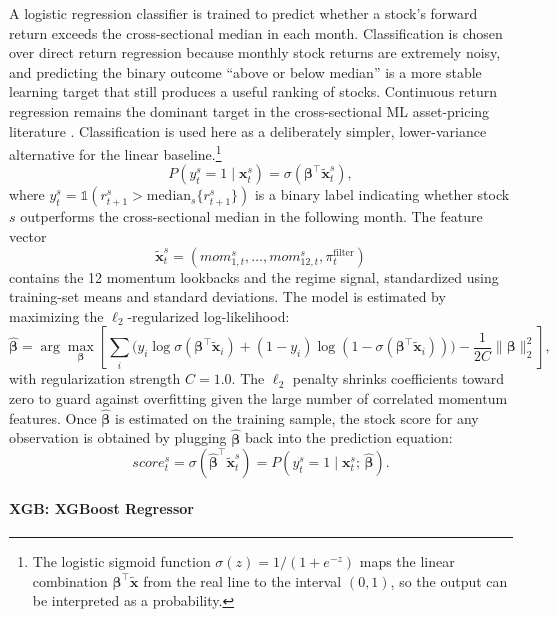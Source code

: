 A logistic regression classifier is trained to predict whether a stock's forward return exceeds the cross-sectional median in each month. Classification is chosen over direct return regression because monthly stock returns are extremely noisy, and predicting the binary outcome ``above or below median'' is a more stable learning target that still produces a useful ranking of stocks. Continuous return regression remains the dominant target in the cross-sectional ML asset-pricing literature \citep{Gu2020}. Classification is used here as a deliberately simpler, lower-variance alternative for the linear baseline.\footnote{The logistic sigmoid function $\sigma(z) = 1/(1 + e^{-z})$ maps the linear combination $\boldsymbol{\beta}^\top \tilde{\mathbf{x}}$ from the real line to the interval $(0, 1)$, so the output can be interpreted as a probability.}
\begin{equation}
    P(y_t^s = 1 \mid \mathbf{x}_t^s) = \sigma(\boldsymbol{\beta}^\top \tilde{\mathbf{x}}_t^s),
\end{equation}
where $y_t^s = \mathds{1}(r_{t+1}^s > \text{median}_s\{r_{t+1}^s\})$ is a binary label indicating whether stock $s$ outperforms the cross-sectional median in the following month. The feature vector
\[
\tilde{\mathbf{x}}_t^s = (mom_{1,t}^s, \dots, mom_{12,t}^s, \pi_t^{\text{filter}})
\]
contains the 12 momentum lookbacks and the regime signal, standardized using training-set means and standard deviations. The model is estimated by maximizing the $\ell_2$-regularized log-likelihood:
\begin{equation}
    \hat{\boldsymbol{\beta}} = \arg\max_{\boldsymbol{\beta}} \left[\sum_{i} \Big(y_i \log \sigma(\boldsymbol{\beta}^\top \tilde{\mathbf{x}}_i) + (1 - y_i) \log(1 - \sigma(\boldsymbol{\beta}^\top \tilde{\mathbf{x}}_i))\Big) - \frac{1}{2C} \|\boldsymbol{\beta}\|_2^2\right],
\end{equation}
with regularization strength $C = 1.0$. The $\ell_2$ penalty shrinks coefficients toward zero to guard against overfitting given the large number of correlated momentum features. Once $\hat{\boldsymbol{\beta}}$ is estimated on the training sample, the stock score for any observation is obtained by plugging $\hat{\boldsymbol{\beta}}$ back into the prediction equation:
\begin{equation}
    score_t^s = \sigma(\hat{\boldsymbol{\beta}}^\top \tilde{\mathbf{x}}_t^s) = P(y_t^s = 1 \mid \mathbf{x}_t^s;\, \hat{\boldsymbol{\beta}}).
\end{equation}

\paragraph{XGB: XGBoost Regressor}\label{sec:method2}

